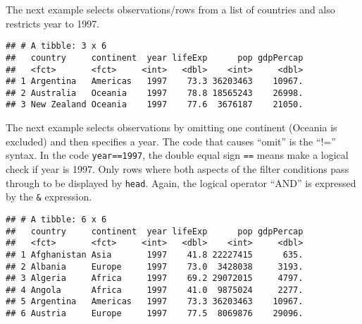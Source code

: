 \documentclass[]{book}
\newenvironment{Shaded}{\begin{snugshade}}{\end{snugshade}}
\newcommand{\KeywordTok}[1]{\textcolor[rgb]{0.13,0.29,0.53}{\textbf{#1}}}
\newcommand{\DecValTok}[1]{\textcolor[rgb]{0.00,0.00,0.81}{#1}}
\newcommand{\StringTok}[1]{\textcolor[rgb]{0.31,0.60,0.02}{#1}}
\newcommand{\OperatorTok}[1]{\textcolor[rgb]{0.81,0.36,0.00}{\textbf{#1}}}
\newcommand{\NormalTok}[1]{#1}
\begin{document}
The next example selects observations/rows from a list of countries and
also restricts year to 1997.

\begin{Shaded}
\end{Shaded}

\begin{verbatim}
## # A tibble: 3 x 6
##   country     continent  year lifeExp      pop gdpPercap
##   <fct>       <fct>     <int>   <dbl>    <int>     <dbl>
## 1 Argentina   Americas   1997    73.3 36203463    10967.
## 2 Australia   Oceania    1997    78.8 18565243    26998.
## 3 New Zealand Oceania    1997    77.6  3676187    21050.
\end{verbatim}

The next example selects observations by omitting one continent (Oceania
is excluded) and then specifies a year. The code that causes ``omit'' is
the ``!='' syntax. In the code \texttt{year==1997}, the double equal
sign \texttt{==} means make a logical check if year is 1997. Only rows
where both aspects of the filter conditions pass through to be displayed
by \texttt{head}. Again, the logical operator ``AND'' is expressed by
the \texttt{\&} expression.

\begin{Shaded}
\end{Shaded}

\begin{verbatim}
## # A tibble: 6 x 6
##   country     continent  year lifeExp      pop gdpPercap
##   <fct>       <fct>     <int>   <dbl>    <int>     <dbl>
## 1 Afghanistan Asia       1997    41.8 22227415      635.
## 2 Albania     Europe     1997    73.0  3428038     3193.
## 3 Algeria     Africa     1997    69.2 29072015     4797.
## 4 Angola      Africa     1997    41.0  9875024     2277.
## 5 Argentina   Americas   1997    73.3 36203463    10967.
## 6 Austria     Europe     1997    77.5  8069876    29096.
\end{verbatim}
\end{document}
